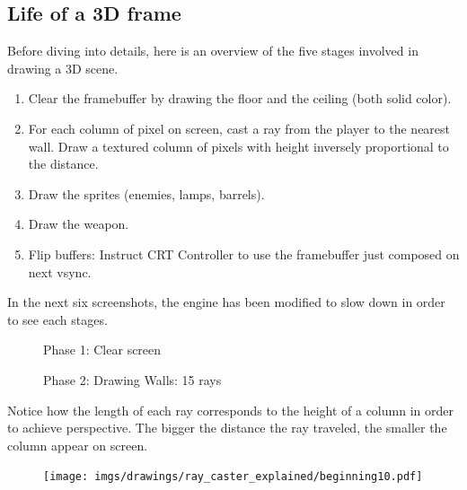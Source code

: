 \subsection{Life of a 3D frame}
Before diving into details, here is an overview of the five stages involved in drawing a 3D scene.\\
\begin{enumerate}
 \item Clear the framebuffer by drawing the floor and the ceiling (both solid color).
 \item For each column of pixel on screen, cast a ray from the player to the nearest wall. Draw a textured column of pixels with height inversely proportional to the distance.
 \item Draw the sprites (enemies, lamps, barrels).
 \item Draw the weapon.	
 \item Flip buffers: Instruct CRT Controller to use the framebuffer just composed on next vsync.
\end{enumerate}
In the next six screenshots, the engine has been modified to slow down in order to see each stages.\\
\begin{figure}[H]
\centering
 \caption{Phase 1: Clear screen}
 \end{figure}




\begin{figure}[H]
 \centering
  \caption{Phase 2: Drawing Walls: 15 rays} 
\end{figure}
\begin{minipage}{.4\textwidth}
Notice how the length of each ray corresponds to the height of a column in order to achieve perspective. The bigger the distance the ray traveled, the smaller the column appear on screen.
 \end{minipage}
\begin{minipage}{.6\textwidth}
\begin{figure}[H]
  \centering
 \texttt{[image: imgs/drawings/ray\_caster\_explained/beginning10.pdf]}
   
\end{figure}
\end{minipage}





